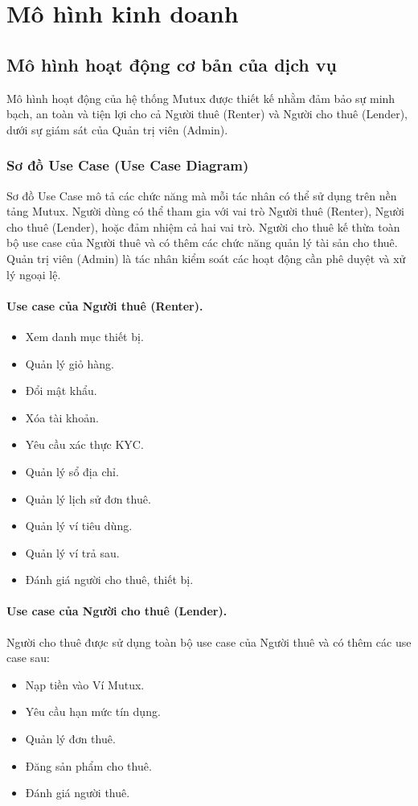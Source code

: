 \section{Mô hình kinh doanh}

\subsection{Mô hình hoạt động cơ bản của dịch vụ}

Mô hình hoạt động của hệ thống Mutux được thiết kế nhằm đảm bảo sự minh bạch, an toàn và tiện lợi cho cả Người thuê (Renter) và Người cho thuê (Lender), dưới sự giám sát của Quản trị viên (Admin).

\subsubsection{Sơ đồ Use Case (Use Case Diagram)}

Sơ đồ Use Case mô tả các chức năng mà mỗi tác nhân có thể sử dụng trên nền tảng Mutux. Người dùng có thể tham gia với vai trò Người thuê (Renter), Người cho thuê (Lender), hoặc đảm nhiệm cả hai vai trò. Người cho thuê kế thừa toàn bộ use case của Người thuê và có thêm các chức năng quản lý tài sản cho thuê. Quản trị viên (Admin) là tác nhân kiểm soát các hoạt động cần phê duyệt và xử lý ngoại lệ.

\paragraph{Use case của Người thuê (Renter).}
\begin{itemize}
    \item Xem danh mục thiết bị.
    \item Quản lý giỏ hàng.
    \item Đổi mật khẩu.
    \item Xóa tài khoản.
    \item Yêu cầu xác thực KYC.
    \item Quản lý sổ địa chỉ.
    \item Quản lý lịch sử đơn thuê.
    \item Quản lý ví tiêu dùng.
    \item Quản lý ví trả sau.
    \item Đánh giá người cho thuê, thiết bị.
\end{itemize}

\paragraph{Use case của Người cho thuê (Lender).}
Người cho thuê được sử dụng toàn bộ use case của Người thuê và có thêm các use case sau:
\begin{itemize}
    \item Nạp tiền vào Ví Mutux.
    \item Yêu cầu hạn mức tín dụng.
    \item Quản lý đơn thuê.
    \item Đăng sản phẩm cho thuê.
    \item Đánh giá người thuê.
\end{itemize}

